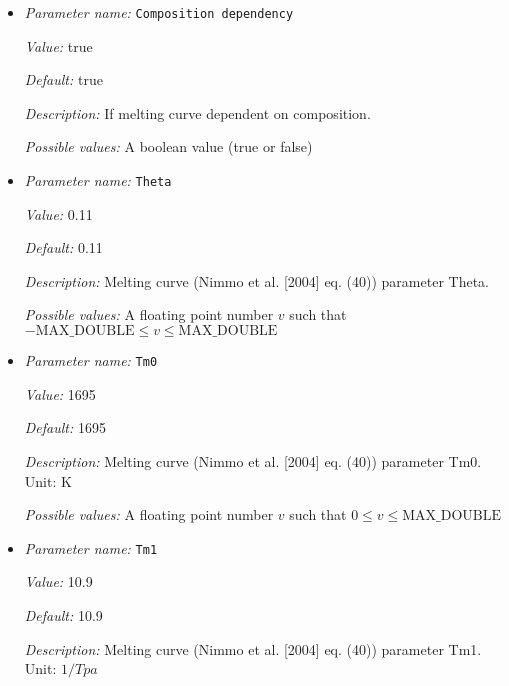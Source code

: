 \begin{itemize}
\item {\it Parameter name:} {\tt Composition dependency}
\label{parameters:Boundary temperature model/Dynamic core/Geotherm parameters/Composition dependency}


{\it Value:} true


{\it Default:} true


{\it Description:} If melting curve dependent on composition.


{\it Possible values:} A boolean value (true or false)
\item {\it Parameter name:} {\tt Theta}
\label{parameters:Boundary temperature model/Dynamic core/Geotherm parameters/Theta}


{\it Value:} 0.11


{\it Default:} 0.11


{\it Description:} Melting curve (Nimmo et al. [2004] eq. (40)) parameter Theta.


{\it Possible values:} A floating point number $v$ such that $-\text{MAX\_DOUBLE} \leq v \leq \text{MAX\_DOUBLE}$
\item {\it Parameter name:} {\tt Tm0}
\label{parameters:Boundary temperature model/Dynamic core/Geotherm parameters/Tm0}


{\it Value:} 1695


{\it Default:} 1695


{\it Description:} Melting curve (Nimmo et al. [2004] eq. (40)) parameter Tm0. Unit: K


{\it Possible values:} A floating point number $v$ such that $0 \leq v \leq \text{MAX\_DOUBLE}$
\item {\it Parameter name:} {\tt Tm1}
\label{parameters:Boundary temperature model/Dynamic core/Geotherm parameters/Tm1}


{\it Value:} 10.9


{\it Default:} 10.9


{\it Description:} Melting curve (Nimmo et al. [2004] eq. (40)) parameter Tm1. Unit: $1/Tpa$



\end{itemize}

